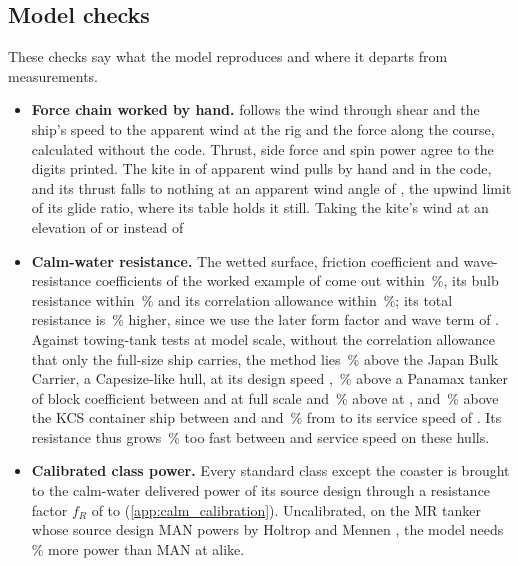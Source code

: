 \subsection{Model checks}
\label{sec:checks}

These checks say what the model reproduces and where it departs from measurements.

\begin{itemize}
\item \textbf{Force chain worked by hand.}  follows the wind through shear and the ship's speed to the apparent wind at the rig and the force along the course, calculated without the code. Thrust, side force and spin power agree to the digits printed. The  kite in  of apparent wind pulls  by hand and in the code, and its thrust falls to nothing at an apparent wind angle of , the upwind limit of its glide ratio, where its table holds it still. Taking the kite's wind at an elevation of  or  instead of  
\item \textbf{Calm-water resistance.} The wetted surface, friction coefficient and wave-resistance coefficients of the worked example of \citet{holtrop1982} come out within \,\%, its bulb resistance within \,\% and its correlation allowance within \,\%; its total resistance is \,\% higher, since we use the later form factor and wave term of \citet{holtrop1984}. Against towing-tank tests at model scale, without the correlation allowance that only the full-size ship carries, the method lies \,\% above the Japan Bulk Carrier, a Capesize-like hull, at its design speed \citep{t2015}, \,\% above a Panamax tanker of block coefficient  between  and  at full scale and \,\% above at  \citep{farkas2017}, and \,\% above the KCS container ship between  and  and \,\% from  to its service speed of  \citep{t2015}. Its resistance thus grows \,\% too fast between  and service speed on these hulls.
\item \textbf{Calibrated class power.} Every standard class except the coaster is brought to the calm-water delivered power of its source design through a resistance factor $f_R$ of  to  (\cref{app:calm_calibration}). Uncalibrated, on the MR tanker whose source design MAN powers by Holtrop and Mennen \citep{man2019mr}, the model needs \,\% more power than MAN at  alike.

\end{itemize}
